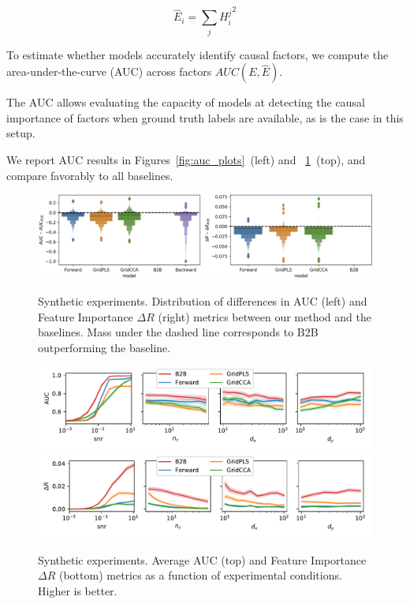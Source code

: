 \begin{equation} \hat E_i = \sum_j {H^j_i}^2 \end{equation}

To estimate whether models accurately identify causal factors, we compute the
area-under-the-curve (AUC) across factors $AUC(E, \hat E)$.

The AUC allows evaluating the capacity of models at detecting the causal
importance of factors when ground truth labels are available, as is the case in
this setup.

We report AUC results in Figures~\ref{fig:auc_plots}~(left) and ~\ref{fig:percondition}~(top), and compare favorably to all baselines.

\begin{figure}
  \centering
  \includegraphics[width=\linewidth]{figures/AUC_R.png}
  \vspace{-4ex}
  \caption{Synthetic experiments. Distribution of differences in AUC (left) and Feature Importance $\Delta R$ (right) metrics between our method and the baselines. Mass under the dashed line corresponds to B2B outperforming the baseline. \label{fig:auc_plots}}
  \vspace{2ex}
  \includegraphics[width=\linewidth]{figures/AUC_conditions}
  \includegraphics[width=\linewidth]{figures/R_conditions}
  \vspace{-4ex}
  \caption{Synthetic experiments. Average AUC (top) and Feature Importance $\Delta R$ (bottom) metrics as a function of experimental conditions. Higher is better. \label{fig:percondition}}
\end{figure}

